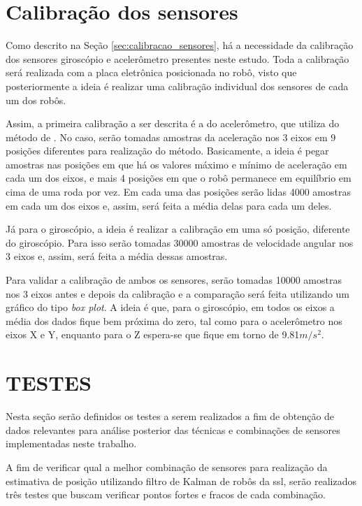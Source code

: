 \documentclass[acronym, symbols, table]{fei}
\begin{document}
	\section{Calibração dos sensores} \label{sec:metodologia_calibracao}
	
		Como descrito na Seção \ref{sec:calibracao_sensores}, há a necessidade da calibração dos sensores giroscópio e acelerômetro presentes neste estudo. Toda a calibração será realizada com a placa eletrônica posicionada no robô, visto que posteriormente a ideia é realizar uma calibração individual dos sensores de cada um dos robôs.
		
		Assim, a primeira calibração a ser descrita é a do acelerômetro, que utiliza do método de \textcite{menezes2020triaxial}. No caso, serão tomadas amostras da aceleração nos 3 eixos em 9 posições diferentes para realização do método. Basicamente, a ideia é pegar amostras nas posições em que há os valores máximo e mínimo de aceleração em cada um dos eixos, e mais 4 posições em que o robô permanece em equilíbrio em cima de uma roda por vez. Em cada uma das posições serão lidas 4000 amostras em cada um dos eixos e, assim, será feita a média delas para cada um deles.
		
		Já para o giroscópio, a ideia é realizar a calibração em uma só posição, diferente do giroscópio. Para isso serão tomadas 30000 amostras de velocidade angular nos 3 eixos e, assim, será feita a média dessas amostras.
		
		Para validar a calibração de ambos os sensores, serão tomadas 10000 amostras nos 3 eixos antes e depois da calibração e a comparação será feita utilizando um gráfico do tipo \textit{box plot}. A ideia é que, para o giroscópio, em todos os eixos a média dos dados fique bem próxima do zero, tal como para o acelerômetro nos eixos X e Y, enquanto para o Z espera-se que fique em torno de 9.81$m/s^{2}$.
	
	\section{TESTES}\label{sec:metodologia_testes}
	
		Nesta seção serão definidos os testes a serem realizados a fim de obtenção de dados relevantes para análise posterior das técnicas e combinações de sensores implementadas neste trabalho.
		
		A fim de verificar qual a melhor combinação de sensores para realização da estimativa de posição utilizando filtro de Kalman de robôs da \acrshort{ssl}, serão realizados três testes que buscam verificar pontos fortes e fracos de cada combinação.
		
\end{document}
